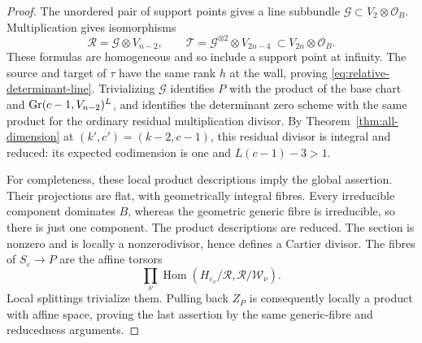 \begin{proof}
The unordered pair of support points gives a line subbundle
$\mathcal G\subset V_2\otimes\mathcal O_B$. Multiplication gives
isomorphisms
\[
 \mathcal R=\mathcal G\otimes V_{n-2},\qquad
 \mathcal T=\mathcal G^{\otimes2}\otimes V_{2n-4}
       \ \subset V_{2n}\otimes\mathcal O_B.
\]
These formulas are homogeneous and so include a support point at
infinity. The source and target of $\tau$ have the same rank $h$
at the wall, proving \eqref{eq:relative-determinant-line}.
Trivializing $\mathcal G$ identifies $P$ with the product of the
base chart and $\operatorname{Gr}(c-1,V_{n-2})^L$, and identifies the determinant
zero scheme with the same product for the ordinary residual
multiplication divisor. By Theorem~\ref{thm:all-dimension} at
$(k',c')=(k-2,c-1)$, this residual divisor is integral and reduced:
its expected codimension is one and $L(c-1)-3>1$.

For completeness, these local product descriptions imply the global
assertion. Their projections are flat, with geometrically integral
fibres. Every irreducible component dominates $B$, whereas the
geometric generic fibre is irreducible, so there is just one component.
The product descriptions are reduced. The section is nonzero and is
locally a nonzerodivisor, hence defines a Cartier divisor. The fibres
of $S_\varepsilon\to P$ are the affine torsors
\[
 \prod_\nu\operatorname{Hom}
       (H_{\varepsilon_\nu}/\mathcal R,\mathcal R/\mathcal W_\nu).
\]
Local splittings trivialize them. Pulling back $Z_P$ is consequently
locally a product with affine space, proving the last assertion by
the same generic-fibre and reducedness arguments.
\end{proof}

